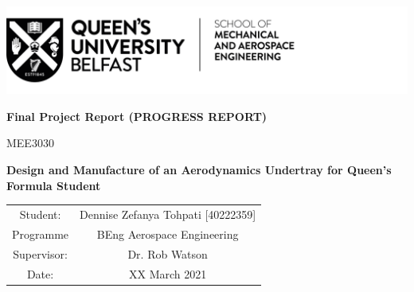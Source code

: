 \begin{titlepage}
\includegraphics[scale=1]{Figures/QUB LOGO - SMAE.png}
\centering

\vspace{4cm}
\textbf{Final Project Report (PROGRESS REPORT)}

MEE3030

\vspace{3cm}
\textbf{Design and Manufacture of an Aerodynamics Undertray for Queen's Formula Student}


\vspace{7cm}
\begin{tabular}{cc}
    Student: &  \quad Dennise Zefanya Tohpati [40222359]\\
    Programme & \quad BEng Aerospace Engineering\\
    Supervisor: & \quad Dr. Rob Watson\\
    Date: & \quad XX March 2021
    
    
\end{tabular}
\newpage
\end{titlepage}
